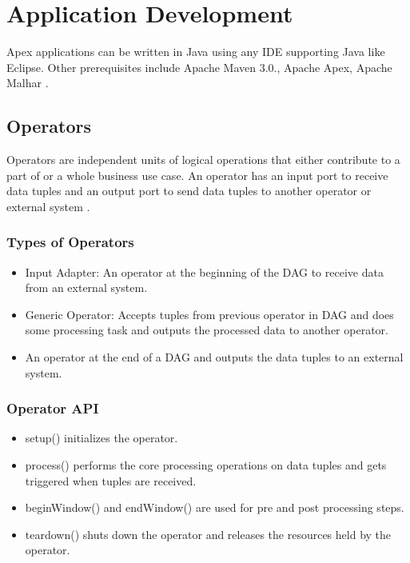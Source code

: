 \documentclass[9pt,twocolumn,twoside]{../../styles/osajnl}
\begin{document}
\section{Application Development}
Apex applications can be written in Java using any IDE supporting Java like Eclipse.
Other prerequisites include Apache Maven 3.0., Apache Apex, Apache Malhar \cite{www-apacheapexappdevdoc}.

\subsection{Operators}
Operators are independent units of logical operations that either contribute to a part of or a whole business use case. An operator has an input port to receive data tuples and an output port to send data tuples to another operator  or external system \cite{www-apacheapexoperatordoc}.
\subsubsection{Types of Operators \cite{www-apacheapexoperatordoc}}
\begin{itemize}
  \item Input Adapter:  An operator at the beginning of the DAG to receive data from an external system.
  \item  Generic Operator: Accepts tuples from previous operator in DAG and does some processing task and outputs the processed data to another operator.
  \item An operator at the end of a DAG and outputs the data tuples to an external system. 
  
\end{itemize}

\subsubsection{Operator API \cite{www-apacheapexoperatordoc}}
\begin{itemize}
  \item setup() initializes the operator.
  \item process()  performs the core processing operations on data tuples and gets triggered when tuples are received.
  \item beginWindow()  and endWindow() are used for pre and post processing steps.
  \item teardown() shuts down the operator and releases the resources held by the operator.
\end{itemize}
\end{document}
